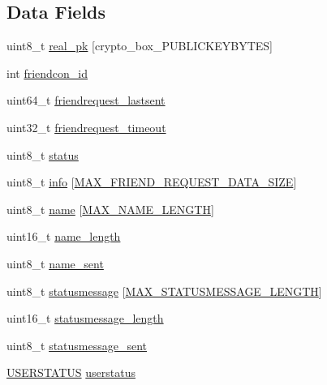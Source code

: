 \subsection*{Data Fields}
\begin{DoxyCompactItemize}
\item 
uint8\+\_\+t \hyperlink{struct_friend_ab42b4c90d81ac99b968c3edd1e21d706}{real\+\_\+pk} \mbox{[}crypto\+\_\+box\+\_\+\+P\+U\+B\+L\+I\+C\+K\+E\+Y\+B\+Y\+T\+E\+S\mbox{]}
\item 
int \hyperlink{struct_friend_aed1c0bb5aeba492059252d0084c8ae9b}{friendcon\+\_\+id}
\item 
uint64\+\_\+t \hyperlink{struct_friend_a1cea2470caaf4282313efe944e95bf35}{friendrequest\+\_\+lastsent}
\item 
uint32\+\_\+t \hyperlink{struct_friend_a671d1f4ab926cb9dc297c3f2743560d4}{friendrequest\+\_\+timeout}
\item 
uint8\+\_\+t \hyperlink{struct_friend_ade818037fd6c985038ff29656089758d}{status}
\item 
uint8\+\_\+t \hyperlink{struct_friend_ae1a1264e17ce4eedae67c283a09236e6}{info} \mbox{[}\hyperlink{friend__requests_8h_a89b7e8b76560d3513fd3b054de738553}{M\+A\+X\+\_\+\+F\+R\+I\+E\+N\+D\+\_\+\+R\+E\+Q\+U\+E\+S\+T\+\_\+\+D\+A\+T\+A\+\_\+\+S\+I\+Z\+E}\mbox{]}
\item 
uint8\+\_\+t \hyperlink{struct_friend_a11b8cc6595eea79e65c978209278e683}{name} \mbox{[}\hyperlink{_messenger_8h_a0c397a708cec89c74029582574516b30}{M\+A\+X\+\_\+\+N\+A\+M\+E\+\_\+\+L\+E\+N\+G\+T\+H}\mbox{]}
\item 
uint16\+\_\+t \hyperlink{struct_friend_a3573d7a906b26e9999cd74f2c4066601}{name\+\_\+length}
\item 
uint8\+\_\+t \hyperlink{struct_friend_acc966be04e3e27e15dfd493c3e9cff89}{name\+\_\+sent}
\item 
uint8\+\_\+t \hyperlink{struct_friend_a8f12612ac1191135a1a5b1cbcbc82852}{statusmessage} \mbox{[}\hyperlink{_messenger_8h_a0d1a4b91dd43b4cb07dfefab7fc6bee1}{M\+A\+X\+\_\+\+S\+T\+A\+T\+U\+S\+M\+E\+S\+S\+A\+G\+E\+\_\+\+L\+E\+N\+G\+T\+H}\mbox{]}
\item 
uint16\+\_\+t \hyperlink{struct_friend_a43fe9dde52dc12e90933150eca91c0c3}{statusmessage\+\_\+length}
\item 
uint8\+\_\+t \hyperlink{struct_friend_ad39189cd22b356c314e4d980b55db259}{statusmessage\+\_\+sent}
\item 
\hyperlink{_messenger_8h_aa55a7166581c83a07f49f9392447986c}{U\+S\+E\+R\+S\+T\+A\+T\+U\+S} \hyperlink{struct_friend_adde524f5a15465585cbc2543cd0b2710}{userstatus}

\end{DoxyCompactItemize}
